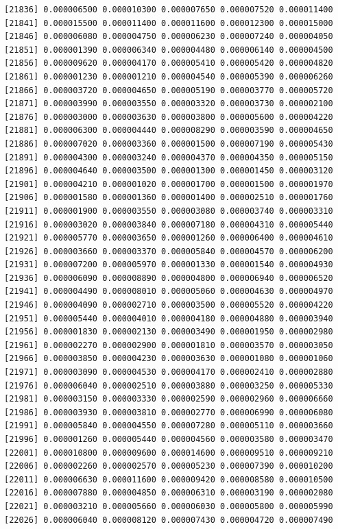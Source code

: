 \documentclass[]{article}
\begin{document}
\begin{verbatim}
[21836] 0.000006500 0.000010300 0.000007650 0.000007520 0.000011400
[21841] 0.000015500 0.000011400 0.000011600 0.000012300 0.000015000
[21846] 0.000006080 0.000004750 0.000006230 0.000007240 0.000004050
[21851] 0.000001390 0.000006340 0.000004480 0.000006140 0.000004500
[21856] 0.000009620 0.000004170 0.000005410 0.000005420 0.000004820
[21861] 0.000001230 0.000001210 0.000004540 0.000005390 0.000006260
[21866] 0.000003720 0.000004650 0.000005190 0.000003770 0.000005720
[21871] 0.000003990 0.000003550 0.000003320 0.000003730 0.000002100
[21876] 0.000003000 0.000003630 0.000003800 0.000005600 0.000004220
[21881] 0.000006300 0.000004440 0.000008290 0.000003590 0.000004650
[21886] 0.000007020 0.000003360 0.000001500 0.000007190 0.000005430
[21891] 0.000004300 0.000003240 0.000004370 0.000004350 0.000005150
[21896] 0.000004640 0.000003500 0.000001300 0.000001450 0.000003120
[21901] 0.000004210 0.000001020 0.000001700 0.000001500 0.000001970
[21906] 0.000001580 0.000001360 0.000001400 0.000002510 0.000001760
[21911] 0.000001900 0.000003550 0.000003080 0.000003740 0.000003310
[21916] 0.000003020 0.000003840 0.000007180 0.000004310 0.000005440
[21921] 0.000005770 0.000003650 0.000001260 0.000006400 0.000004610
[21926] 0.000003660 0.000003370 0.000005840 0.000004570 0.000006200
[21931] 0.000007200 0.000005970 0.000001330 0.000001540 0.000004930
[21936] 0.000006090 0.000008890 0.000004800 0.000006940 0.000006520
[21941] 0.000004490 0.000008010 0.000005060 0.000004630 0.000004970
[21946] 0.000004090 0.000002710 0.000003500 0.000005520 0.000004220
[21951] 0.000005440 0.000004010 0.000004180 0.000004880 0.000003940
[21956] 0.000001830 0.000002130 0.000003490 0.000001950 0.000002980
[21961] 0.000002270 0.000002900 0.000001810 0.000003570 0.000003050
[21966] 0.000003850 0.000004230 0.000003630 0.000001080 0.000001060
[21971] 0.000003090 0.000004530 0.000004170 0.000002410 0.000002880
[21976] 0.000006040 0.000002510 0.000003880 0.000003250 0.000005330
[21981] 0.000003150 0.000003330 0.000002590 0.000002960 0.000006660
[21986] 0.000003930 0.000003810 0.000002770 0.000006990 0.000006080
[21991] 0.000005840 0.000004550 0.000007280 0.000005110 0.000003660
[21996] 0.000001260 0.000005440 0.000004560 0.000003580 0.000003470
[22001] 0.000010800 0.000009600 0.000014600 0.000009510 0.000009210
[22006] 0.000002260 0.000002570 0.000005230 0.000007390 0.000010200
[22011] 0.000006630 0.000011600 0.000009420 0.000008580 0.000010500
[22016] 0.000007880 0.000004850 0.000006310 0.000003190 0.000002080
[22021] 0.000003210 0.000005660 0.000006030 0.000005800 0.000005990
[22026] 0.000006040 0.000008120 0.000007430 0.000004720 0.000007490

\end{verbatim}
\end{document}
